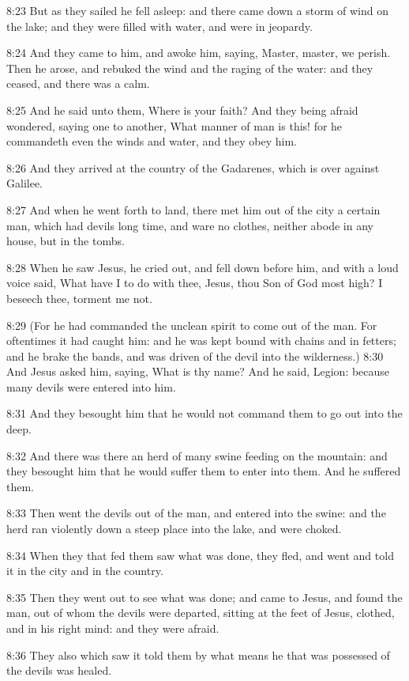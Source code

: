 8:23 But as they sailed he fell asleep: and there came down a storm of
wind on the lake; and they were filled with water, and were in
jeopardy.

8:24 And they came to him, and awoke him, saying, Master, master, we
perish. Then he arose, and rebuked the wind and the raging of the
water: and they ceased, and there was a calm.

8:25 And he said unto them, Where is your faith? And they being afraid
wondered, saying one to another, What manner of man is this! for he
commandeth even the winds and water, and they obey him.

8:26 And they arrived at the country of the Gadarenes, which is over
against Galilee.

8:27 And when he went forth to land, there met him out of the city a
certain man, which had devils long time, and ware no clothes, neither
abode in any house, but in the tombs.

8:28 When he saw Jesus, he cried out, and fell down before him, and
with a loud voice said, What have I to do with thee, Jesus, thou Son
of God most high? I beseech thee, torment me not.

8:29 (For he had commanded the unclean spirit to come out of the man.
For oftentimes it had caught him: and he was kept bound with chains
and in fetters; and he brake the bands, and was driven of the devil
into the wilderness.)  8:30 And Jesus asked him, saying, What is thy
name? And he said, Legion: because many devils were entered into him.

8:31 And they besought him that he would not command them to go out
into the deep.

8:32 And there was there an herd of many swine feeding on the
mountain: and they besought him that he would suffer them to enter
into them. And he suffered them.

8:33 Then went the devils out of the man, and entered into the swine:
and the herd ran violently down a steep place into the lake, and were
choked.

8:34 When they that fed them saw what was done, they fled, and went
and told it in the city and in the country.

8:35 Then they went out to see what was done; and came to Jesus, and
found the man, out of whom the devils were departed, sitting at the
feet of Jesus, clothed, and in his right mind: and they were afraid.

8:36 They also which saw it told them by what means he that was
possessed of the devils was healed.


